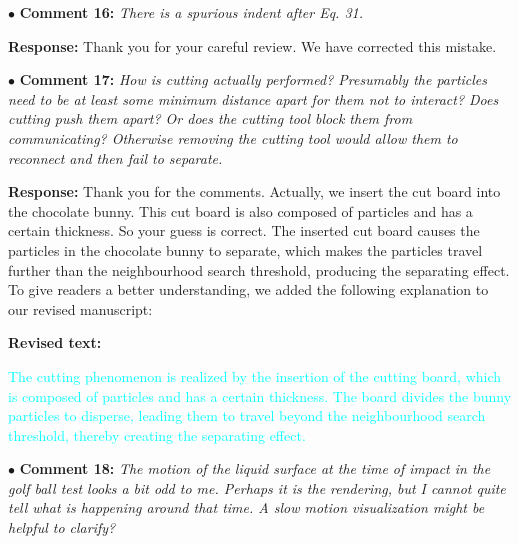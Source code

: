\documentclass[12pt,a4paper]{article}
\newcommand{\revised}[1]{\textcolor{cyan}{#1}}
\begin{document}

\vspace{0.4cm}
\noindent$\bullet$ \enspace \textbf{Comment 16:}
\textit{There is a spurious indent after Eq. 31.}

\vspace{0.2cm}
\textbf{Response:}
Thank you for your careful review. We have corrected this mistake.


\vspace{0.4cm}
\noindent$\bullet$ \enspace \textbf{Comment 17:}
\textit{How is cutting actually performed? Presumably the particles need to be at least some minimum distance apart for them not to interact? Does cutting push them apart? Or does the cutting tool block them from communicating? Otherwise removing the cutting tool would allow them to reconnect and then fail to separate. }

\vspace{0.2cm}
\textbf{Response:}
Thank you for the comments. Actually, we insert the cut board into the chocolate bunny. This cut board is also composed of particles and has a certain thickness. So your guess is correct. The inserted cut board causes the particles in the chocolate bunny to separate, which makes the particles travel further than the neighbourhood search threshold, producing the separating effect. To give readers a better understanding, we added the following explanation to our revised manuscript:

\vspace{0.2cm}
\textbf{Revised text:}

\revised{
The cutting phenomenon is realized by the insertion of the cutting board, which is composed of particles and has a certain thickness. The board divides the bunny particles to disperse, leading them to travel beyond the neighbourhood search threshold, thereby creating the separating effect.}



\vspace{0.4cm}
\noindent$\bullet$ \enspace \textbf{Comment 18:}
\textit{ The motion of the liquid surface at the time of impact in the golf ball test looks a bit odd to me. Perhaps it is the rendering, but I cannot quite tell what is happening around that time. A slow motion visualization might be helpful to clarify?  }
\end{document}
